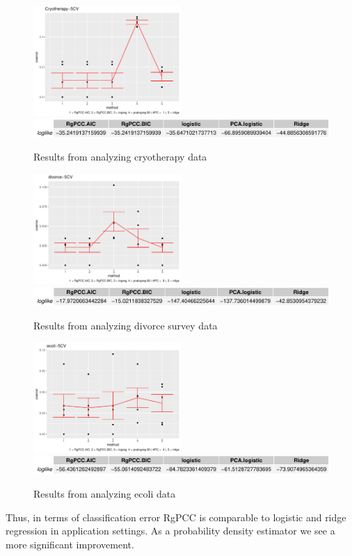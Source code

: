 \documentclass[main.tex]{subfiles}
\begin{document}
\begin{figure}[H]
    \centering

    \includegraphics[width = 0.5\textwidth]{R-code/data/Cryotherapy-5CVgraph.pdf}
    \includegraphics[width = \textwidth]{R-code/data/Cryotherapy-5CVloglike.pdf}
    \label{fig:cryo}
    \caption{Results from analyzing cryotherapy data}
\end{figure}

\begin{figure}[H]
	\centering
	
	\includegraphics[width = 0.5\textwidth]{R-code/data/divorce-5CVgraph.pdf}
	\includegraphics[width = \textwidth]{R-code/data/divorce-5CVloglike.pdf}
	\label{fig:divorce}
	\caption{Results from analyzing divorce survey data}
\end{figure}

\begin{figure}[H]
	\centering
	
	\includegraphics[width = 0.5\textwidth]{R-code/data/ecoli-5CVgraph.pdf}
	\includegraphics[width = \textwidth]{R-code/data/ecoli-5CVloglike.pdf}
	\label{fig:ecoli}
	\caption{Results from analyzing ecoli data}
\end{figure}

Thus, in terms of classification error RgPCC is comparable to logistic and ridge regression in application settings. As a probability density estimator we see a more significant improvement.
\end{document}

